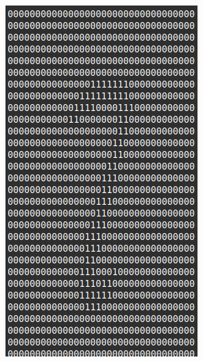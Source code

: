 \begin{figure}[htbp]
\begin{subfigure}[b]{0.2\linewidth}
		\includegraphics[width=1\linewidth]{pics/wrong_output_predict2.png}
		\label{fig:sub2}
	\end{subfigure}
	\hfill
	\begin{subfigure}[b]{0.2\linewidth}

\end{subfigure}
\end{figure}
